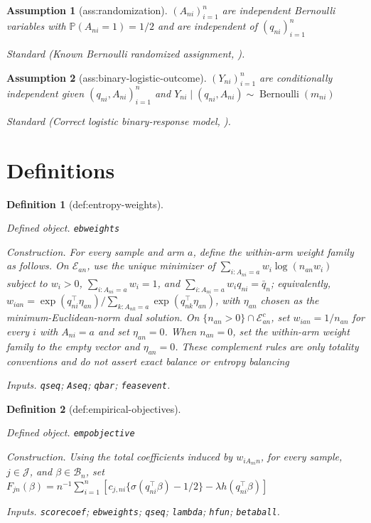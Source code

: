 \documentclass{article}
\newtheorem{assumption}{Assumption}
\newtheorem{definition}{Definition}
\begin{document}
\begin{assumption}[ass:randomization]\label{ass:randomization}
\((A_{ni})_{i=1}^{n}\) are independent Bernoulli variables with \(\mathbb P(A_{ni}=1)=1/2\) and are independent of \((q_{ni})_{i=1}^{n}\)
\par\smallskip\noindent\emph{Standard} (Known Bernoulli randomized assignment, \cite{FangRidderXie2026}).
\end{assumption}

\begin{assumption}[ass:binary-logistic-outcome]\label{ass:binary-logistic-outcome}
\((Y_{ni})_{i=1}^{n}\) are conditionally independent given \((q_{ni},A_{ni})_{i=1}^{n}\) and \(Y_{ni}\mid(q_{ni},A_{ni})\sim\operatorname{Bernoulli}(m_{ni})\)
\par\smallskip\noindent\emph{Standard} (Correct logistic binary-response model, \cite{SurCandes2019}).
\end{assumption}

\section{Definitions}

\begin{definition}[def:entropy-weights]\label{def:entropy-weights}
\par\smallskip\noindent\emph{Defined object.} \texttt{ebweights}
\par\smallskip\noindent\emph{Construction.} For every sample and arm \(a\), define the within-arm weight family as follows. On \(\mathcal E_{an}\), use the unique minimizer of \(\sum_{i:A_{ni}=a}w_i\log(n_{an}w_i)\) subject to \(w_i>0\), \(\sum_{i:A_{ni}=a}w_i=1\), and \(\sum_{i:A_{ni}=a}w_iq_{ni}=\bar q_n\); equivalently, \(w_{ian}=\exp(q_{ni}^{\top}\eta_{an})/\sum_{k:A_{nk}=a}\exp(q_{nk}^{\top}\eta_{an})\), with \(\eta_{an}\) chosen as the minimum-Euclidean-norm dual solution. On \(\{n_{an}>0\}\cap\mathcal E_{an}^{c}\), set \(w_{ian}=1/n_{an}\) for every \(i\) with \(A_{ni}=a\) and set \(\eta_{an}=0\). When \(n_{an}=0\), set the within-arm weight family to the empty vector and \(\eta_{an}=0\). These complement rules are only totality conventions and do not assert exact balance or entropy balancing
\par\smallskip\noindent\emph{Inputs.} \texttt{qseq}; \texttt{Aseq}; \texttt{qbar}; \texttt{feasevent}.
\end{definition}

\begin{definition}[def:empirical-objectives]\label{def:empirical-objectives}
\par\smallskip\noindent\emph{Defined object.} \texttt{empobjective}
\par\smallskip\noindent\emph{Construction.} Using the total coefficients induced by \(w_{iA_{ni}n}\), for every sample, \(j\in\mathcal J\), and \(\beta\in\mathcal B_n\), set \(F_{jn}(\beta)=n^{-1}\sum_{i=1}^{n}[c_{j,ni}\{\sigma(q_{ni}^{\top}\beta)-1/2\}-\lambda h(q_{ni}^{\top}\beta)]\)
\par\smallskip\noindent\emph{Inputs.} \texttt{scorecoef}; \texttt{ebweights}; \texttt{qseq}; \texttt{lambda}; \texttt{hfun}; \texttt{betaball}.
\end{definition}
\end{document}
